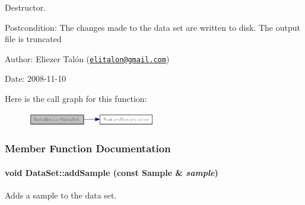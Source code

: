 Destructor. 

\begin{Desc}
\item[Postcondition:]The changes made to the data set are written to disk. The output file is truncated\end{Desc}
\begin{Desc}
\item[Author:]Eliezer Talón (\href{mailto:elitalon@gmail.com}{\tt elitalon@gmail.com}) \end{Desc}
\begin{Desc}
\item[Date:]2008-11-10 \end{Desc}


Here is the call graph for this function:\nopagebreak
\begin{figure}[H]
\begin{center}
\leavevmode
\includegraphics[width=159pt]{class_data_set_2cdb84d32331956b413ca36933e516bd_cgraph}
\end{center}
\end{figure}


\subsubsection{Member Function Documentation}
\hypertarget{class_data_set_73b646f0b40545eaf7bbe72418a0ed51}{
\paragraph[{addSample}]{\setlength{\rightskip}{0pt plus 5cm}void DataSet::addSample (const {\bf Sample} \& {\em sample})}\hfill}
\label{class_data_set_73b646f0b40545eaf7bbe72418a0ed51}


Adds a sample to the data set. 

